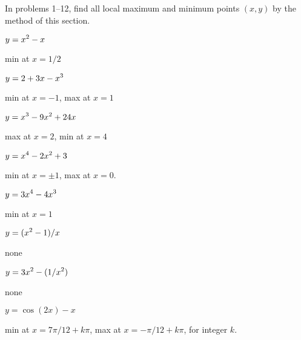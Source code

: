 \begin{exercises} In problems 1--12, find all local maximum and minimum
points $(x,y)$ by the method of this section.

\twocol
\begin{exercise} $\displaystyle y=x^2-x$ 
\begin{answer} min at $x=1/2$
\end{answer}\end{exercise}

\begin{exercise} $\displaystyle y=2+3x-x^3$ 
\begin{answer} min at $x=-1$, max at $x=1$
\end{answer}\end{exercise}

\begin{exercise} $\displaystyle y=x^3-9x^2+24x$
\begin{answer} max at $x=2$, min at $x=4$
\end{answer}\end{exercise}

\begin{exercise} $\displaystyle y=x^4-2x^2+3$ 
\begin{answer} min at $x=\pm 1$, max at $x=0$.
\end{answer}\end{exercise}

\begin{exercise} $\displaystyle y=3x^4-4x^3$
\begin{answer} min at $x=1$
\end{answer}\end{exercise}

\begin{exercise} $\displaystyle y=(x^2-1)/x$
\begin{answer} none
\end{answer}\end{exercise}

\begin{exercise} $\displaystyle y=3x^2-(1/x^2)$ 
\begin{answer} none
\end{answer}\end{exercise}

\begin{exercise} $y=\cos(2x)-x$ 
\begin{answer} min at $x=7\pi/12+k\pi$, max at $x=-\pi/12+k\pi$, for integer $k$.
\end{answer}\end{exercise}


\end{exercises}
